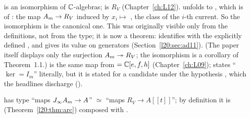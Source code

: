 \begin{dictionary}
 is an isomorphism of ${\mathbb{C}}$-algebras;  is $R_V$ (Chapter~\ref{ch:L12}).
 unfolds to , which is  of
: the map $A_m\to R_V$ induced by $x_i\mapsto$ , the class of the $i$-th
current. So the isomorphism is the canonical one. This was originally visible only from the definitions, not from the
type; it is now a theorem:  identifies  with the explicitly defined
, and  gives its value on generators (Section~\ref{l20:sec:ad11}). (The paper itself displays only the
surjection $A_m\twoheadrightarrow R_V$; the isomorphism is a corollary of Theorem~1.1.)  is the same map from  $={\mathbb{C}}[e,f,h]$ (Chapter~\ref{ch:L09});
 states ``$\ker=I_m$'' literally, but it is stated for a candidate under the
hypothesis , which the headlines discharge ().

 has type ``maps $J_\infty A_m\to A$'' $\simeq$ ``maps $R_V\to A[[t]]$''; by definition it is
 (Theorem~\ref{l20:thm:arc}) composed with .
\end{dictionary}

